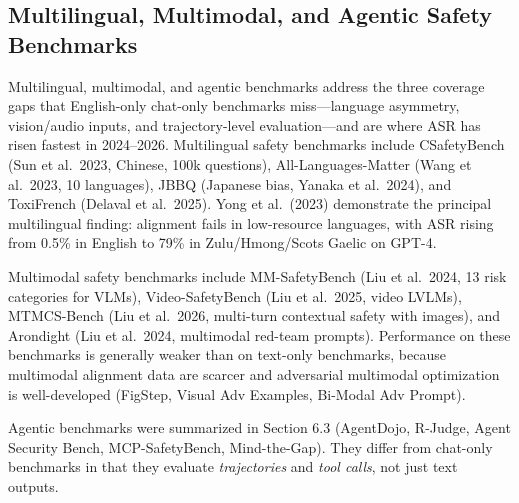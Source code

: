 \subsection{Multilingual, Multimodal, and Agentic Safety Benchmarks}\label{multilingual-multimodal-and-agentic-safety-benchmarks}

Multilingual, multimodal, and agentic benchmarks address the three coverage gaps that English-only chat-only benchmarks miss---language asymmetry, vision/audio inputs, and trajectory-level evaluation---and are where ASR has risen fastest in 2024--2026. Multilingual safety benchmarks include CSafetyBench (Sun et al.~2023, Chinese, 100k questions), All-Languages-Matter (Wang et al.~2023, 10 languages), JBBQ (Japanese bias, Yanaka et al.~2024), and ToxiFrench (Delaval et al.~2025). Yong et al.~(2023) demonstrate the principal multilingual finding: alignment fails in low-resource languages, with ASR rising from 0.5\% in English to 79\% in Zulu/Hmong/Scots Gaelic on GPT-4.

Multimodal safety benchmarks include MM-SafetyBench (Liu et al.~2024, 13 risk categories for VLMs), Video-SafetyBench (Liu et al.~2025, video LVLMs), MTMCS-Bench (Liu et al.~2026, multi-turn contextual safety with images), and Arondight (Liu et al.~2024, multimodal red-team prompts). Performance on these benchmarks is generally weaker than on text-only benchmarks, because multimodal alignment data are scarcer and adversarial multimodal optimization is well-developed (FigStep, Visual Adv Examples, Bi-Modal Adv Prompt).

Agentic benchmarks were summarized in Section 6.3 (AgentDojo, R-Judge, Agent Security Bench, MCP-SafetyBench, Mind-the-Gap). They differ from chat-only benchmarks in that they evaluate \emph{trajectories} and \emph{tool calls}, not just text outputs.

